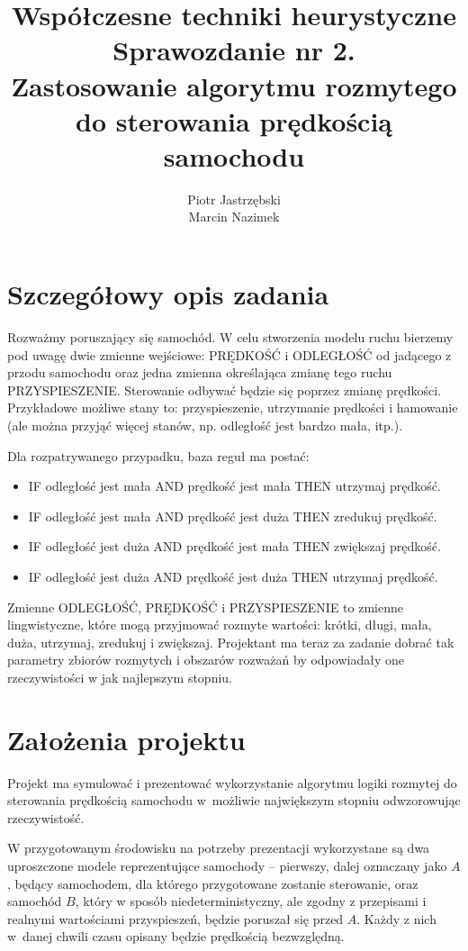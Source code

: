 \documentclass[11pt,a4paper]{article}
\title{Współczesne techniki heurystyczne\\ Sprawozdanie nr 2.\\ \large Zastosowanie algorytmu rozmytego do sterowania prędkością samochodu}
\author{Piotr Jastrzębski\\ Marcin Nazimek}
\date{}
\begin{document}
\maketitle

\section{Szczegółowy opis zadania}\label{opis}
Rozważmy poruszający się samochód. W celu stworzenia modelu ruchu bierzemy pod uwagę dwie zmienne wejściowe: PRĘDKOŚĆ i ODLEGŁOŚĆ od jadącego z przodu samochodu oraz jedna zmienna określająca zmianę tego ruchu PRZYSPIESZENIE. Sterowanie odbywać będzie się poprzez zmianę prędkości. Przykładowe możliwe stany to: przyspieszenie, utrzymanie prędkości i hamowanie (ale można przyjąć więcej stanów, np. odległość jest bardzo mała, itp.).

Dla rozpatrywanego przypadku, baza reguł ma postać:
\begin{itemize}
\item IF odległość jest mała AND prędkość jest mała THEN utrzymaj prędkość.
\item IF odległość jest mała AND prędkość jest duża THEN zredukuj prędkość.
\item IF odległość jest duża AND prędkość jest mała THEN zwiększaj prędkość.
\item IF odległość jest duża AND prędkość jest duża THEN utrzymaj prędkość.
\end{itemize}
Zmienne ODLEGŁOŚĆ, PRĘDKOŚĆ i PRZYSPIESZENIE to zmienne lingwistyczne, które mogą przyjmować rozmyte wartości: krótki, długi, mała, duża, utrzymaj, zredukuj i zwiększaj. Projektant ma teraz za zadanie dobrać tak parametry zbiorów rozmytych i obszarów rozważań by odpowiadały one rzeczywistości w jak najlepszym stopniu.

\section{Założenia projektu}\label{zalozenia}
Projekt ma symulować i prezentować wykorzystanie algorytmu logiki rozmytej do sterowania prędkością samochodu w~możliwie największym stopniu odwzorowując rzeczywistość.

W przygotowanym środowisku na potrzeby prezentacji wykorzystane są dwa uproszczone modele reprezentujące samochody -- pierwszy, dalej oznaczany jako $A$, będący samochodem, dla którego przygotowane zostanie sterowanie, oraz samochód $B$, który w sposób niedeterministyczny, ale zgodny z przepisami i realnymi wartościami przyspieszeń, będzie poruszał się przed $A$. Każdy z nich w~danej chwili czasu opisany będzie prędkością bezwzględną. 
\end{document}
